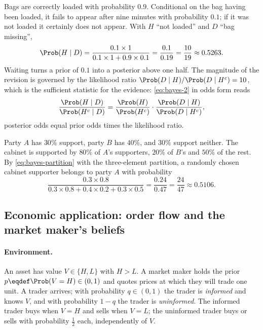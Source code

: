 \begin{eg}\label{eg:carousel}
	Bags are correctly loaded with probability $0.9$. Conditional on the bag having
	been loaded, it fails to appear after nine minutes with probability $0.1$; if it
	was not loaded it certainly does not appear. With $H$ ``not loaded'' and $D$
	``bag missing'',
	\[
		\Prob(H\mid D)=\frac{0.1\times1}{0.1\times1+0.9\times0.1}
		=\frac{0.1}{0.19}=\frac{10}{19}\approx0.5263 .
	\]
	Waiting turns a prior of $0.1$ into a posterior above one half. The magnitude of
	the revision is governed by the likelihood ratio
	$\Prob(D\mid H)/\Prob(D\mid H^{c})=10$, which is the sufficient statistic
	for the evidence: \eqref{eq:bayes-2} in odds form reads
	\begin{equation}\label{eq:odds-form}
		\frac{\Prob(H\mid D)}{\Prob(H^{c}\mid D)}
		=\frac{\Prob(H)}{\Prob(H^{c})}\cdot
		\frac{\Prob(D\mid H)}{\Prob(D\mid H^{c})},
	\end{equation}
	posterior odds equal prior odds times the likelihood ratio.
\end{eg}

\begin{eg}[A poll]\label{eg:poll}
	Party $A$ has $30\%$ support, party $B$ has $40\%$, and $30\%$ support neither.
	The cabinet is supported by $80\%$ of $A$'s supporters, $20\%$ of $B$'s and
	$50\%$ of the rest. By \eqref{eq:bayes-partition} with the three-element
	partition, a randomly chosen cabinet supporter belongs to party $A$ with
	probability
	\[
		\frac{0.3\times0.8}{0.3\times0.8+0.4\times0.2+0.3\times0.5}
		=\frac{0.24}{0.47}=\frac{24}{47}\approx0.5106 .
	\]
\end{eg}

\subsection{Economic application: order flow and the market maker's beliefs}
\label{subsec:prob-microstructure}

\paragraph{Environment.} An asset has value $V\in\{H,L\}$ with $H>L$. A market
maker holds the prior $p\eqdef\Prob(V=H)\in(0,1)$ and quotes prices at which
they will trade one unit. A trader arrives; with probability $q\in(0,1)$ the
trader is \emph{informed} and knows $V$, and with probability $1-q$ the trader is
\emph{uninformed}. The informed trader buys when $V=H$ and sells when $V=L$; the
uninformed trader buys or sells with probability $\tfrac12$ each, independently of
$V$.


